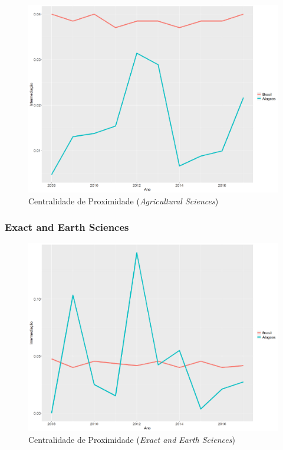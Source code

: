 \begin{figure}[H]
	\centering
	\includegraphics[scale=0.4]{Imagens/agricultural/graf-linha-betweeness-br-al.pdf}
	\caption{Centralidade de Proximidade (\textit{Agricultural Sciences})}
	\label{between-agri}
\end{figure}

\subsubsection{Exact and Earth Sciences}

\begin{figure}[H]
	\centering
	\includegraphics[scale=0.4]{Imagens/exact/graf-linha-betweeness-br-al.pdf}
	\caption{Centralidade de Proximidade (\textit{Exact and Earth Sciences})}
	\label{between-exact}
\end{figure}

